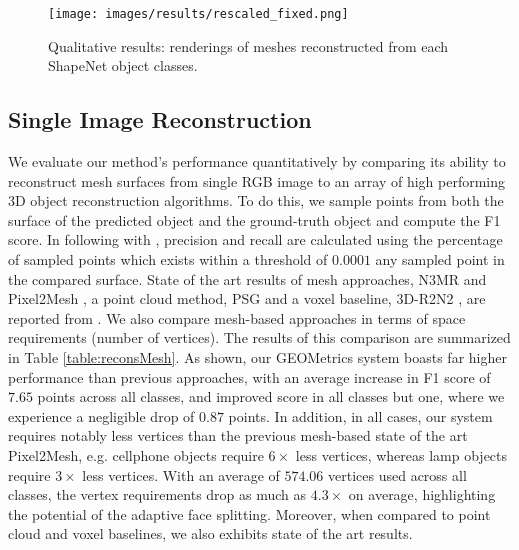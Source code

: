 \documentclass{article}
\begin{document}
\begin{figure*}[ht!]
\centering
\texttt{[image: images/results/rescaled\_fixed.png]}
\vspace{-0.4cm}
\caption{Qualitative results: renderings of meshes reconstructed from each ShapeNet object classes.} \label{fig:ReconstructionResults}
\vspace{-0.2cm}
\end{figure*}

\subsection{Single Image Reconstruction}

We evaluate our method's performance quantitatively by comparing its ability to reconstruct mesh surfaces from single RGB image to an array of high performing 3D object reconstruction algorithms. To do this, we sample points from both the surface of the predicted object and the ground-truth object and compute the F1 score. In following with \cite{Pixel2Mesh}, precision and recall are calculated using the percentage of sampled points which exists within a threshold of $0.0001$ any sampled point in the compared surface. State of the art results of mesh approaches, N3MR \cite{kato2017neural} and Pixel2Mesh \cite{Pixel2Mesh}, a point cloud method, PSG \cite{fan2017point} and a voxel baseline, 3D-R2N2 \cite{choy20163d}, are reported from \citet{Pixel2Mesh}. We also compare mesh-based approaches in terms of space requirements (number of vertices). The results of this comparison are summarized in Table \ref{table:reconsMesh}. As shown, our GEOMetrics system boasts far higher performance than previous approaches, with an average increase in F1 score of $7.65$ points across all classes, and improved score in all classes but one, where we experience a negligible drop of $0.87$ points. In addition, in all cases, our system requires notably less vertices than the previous mesh-based state of the art Pixel2Mesh, e.g. cellphone objects require $6\times$ less vertices, whereas lamp objects require $3\times$ less vertices. With an average of $574.06$ vertices used across all classes, the vertex requirements drop as much as $4.3\times$ on average, highlighting the potential of the adaptive face splitting. Moreover, when compared to point cloud and voxel baselines, we also exhibits state of the art results.
\end{document}
